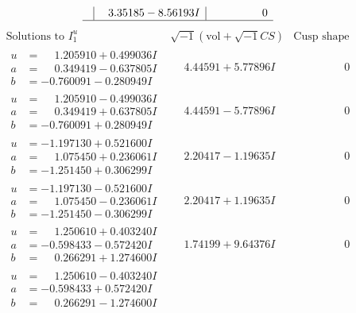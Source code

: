 \documentclass[1p]{elsarticle_modified}
\theoremstyle{definition}
\newcommand{\I}{\sqrt{-1}}
\begin{document}
$$\begin{array}{c|c|c}
 & \phantom{-}3.35185 - 8.56193 I & \phantom{-0.000000 } 0\\
 \hline 
 \end{array}$$\newpage$$\begin{array}{c|c|c}  
\text{Solutions to }I^u_{1}& \I (\text{vol} + \sqrt{-1}CS) & \text{Cusp shape}\\
 \hline 
\begin{aligned}
u &= \phantom{-}1.205910 + 0.499036 I \\
a &= \phantom{-}0.349419 - 0.637805 I \\
b &= -0.760091 - 0.280949 I\end{aligned}
 & \phantom{-}4.44591 + 5.77896 I & \phantom{-0.000000 } 0 \\ \hline\begin{aligned}
u &= \phantom{-}1.205910 - 0.499036 I \\
a &= \phantom{-}0.349419 + 0.637805 I \\
b &= -0.760091 + 0.280949 I\end{aligned}
 & \phantom{-}4.44591 - 5.77896 I & \phantom{-0.000000 } 0 \\ \hline\begin{aligned}
u &= -1.197130 + 0.521600 I \\
a &= \phantom{-}1.075450 + 0.236061 I \\
b &= -1.251450 + 0.306299 I\end{aligned}
 & \phantom{-}2.20417 - 1.19635 I & \phantom{-0.000000 } 0 \\ \hline\begin{aligned}
u &= -1.197130 - 0.521600 I \\
a &= \phantom{-}1.075450 - 0.236061 I \\
b &= -1.251450 - 0.306299 I\end{aligned}
 & \phantom{-}2.20417 + 1.19635 I & \phantom{-0.000000 } 0 \\ \hline\begin{aligned}
u &= \phantom{-}1.250610 + 0.403240 I \\
a &= -0.598433 - 0.572420 I \\
b &= \phantom{-}0.266291 + 1.274600 I\end{aligned}
 & \phantom{-}1.74199 + 9.64376 I & \phantom{-0.000000 } 0 \\ \hline\begin{aligned}
u &= \phantom{-}1.250610 - 0.403240 I \\
a &= -0.598433 + 0.572420 I \\
b &= \phantom{-}0.266291 - 1.274600 I\end{aligned}

\end{array}$$
\end{document}
